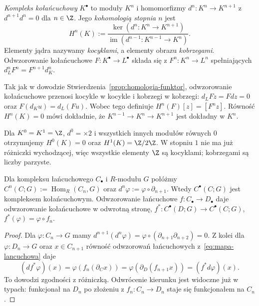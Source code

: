 \begin{definicja}
\label{def:kohomologia-algebraiczna}
\emph{Kompleks kołańcuchowy} $K^\bullet$ to
moduły $K^n$ i homomorfizmy
$d^n:K^n\to K^{n+1}$ z
$d^{n+1}d^n=0$ dla $n\in\Z$. Jego \emph{kohomologią stopnia $n$}
jest
\begin{equation}\label{eq:kohomologia-def}
 H^n(K):=\frac{\ker(d^n:K^n\to K^{n+1})}
 {\operatorname{im}(d^{n-1}:K^{n-1}\to K^n)}.
\end{equation}
Elementy jądra nazywamy \emph{kocyklami},
a elementy obrazu \emph{kobrzegami}.
Odwzorowanie kołańcuchowe $F:K^\bullet\to L^\bullet$
składa się z $F^n:K^n\to L^n$ spełniających
$d_L^nF^n=F^{n+1}d_K^n$.
\end{definicja}

Tak jak w dowodzie
Stwierdzenia~\ref{prop:homologia-funktor},
odwzorowanie kołańcuchowe przenosi kocykle w
kocykle i kobrzegi w kobrzegi:
$d_LFz=Fdz=0$ oraz
$F(d_Ku)=d_L(Fu)$. Wobec tego definiuje
$H^n(F)[z]=[F^nz]$. Równość
$H^n(K)=0$ mówi dokładnie, że
$K^{n-1}\to K^n\to K^{n+1}$
jest dokładny w $K^n$.

\begin{przyklad}
Dla $K^0=K^1=\Z$, $d^0=\times2$
i wszystkich innych modułów równych $0$
otrzymujemy $H^0(K)=0$ oraz
$H^1(K)=\Z/2\Z$. W stopniu $1$ nie ma
już różniczki wychodzącej, więc
wszystkie elementy $\Z$ są kocyklami;
kobrzegami są liczby parzyste.
\end{przyklad}

\begin{stwierdzenie}
\label{prop:kompleks-dualny}
Dla kompleksu łańcuchowego $C_\bullet$
i $R$-modułu $G$ połóżmy
$C^n(C;G):=\operatorname{Hom}_R(C_n,G)$ oraz
$d^n\varphi:=\varphi\circ\partial_{n+1}$.
Wtedy $C^\bullet(C;G)$ jest kompleksem
kołańcuchowym. Odwzorowanie łańcuchowe
$f:C_\bullet\to D_\bullet$ daje odwzorowanie
kołańcuchowe w odwrotną stronę,
$f^*:C^\bullet(D;G)\to C^\bullet(C;G)$,
$f^*(\varphi)=\varphi\circ f_n$.
\end{stwierdzenie}
\begin{proof}
Dla $\varphi:C_n\to G$ mamy
$d^{n+1}(d^n\varphi)
=\varphi\circ(\partial_{n+1}\partial_{n+2})=0$.
Z kolei dla $\varphi:D_n\to G$
oraz $x\in C_{n+1}$ równość odwzorowań łańcuchowych
z~\eqref{eq:mapa-lancuchowa} daje
\[
 (d f^*\varphi)(x)
 =\varphi(f_n(\partial_C x))
 =\varphi(\partial_D(f_{n+1}x))
 =(f^*d\varphi)(x).
\]
To dowodzi zgodności z różniczką.
Odwrócenie kierunku jest widoczne już w typach:
funkcjonał na $D_n$ po złożeniu z $f_n:C_n\to D_n$
staje się funkcjonałem na $C_n$.
\end{proof}

